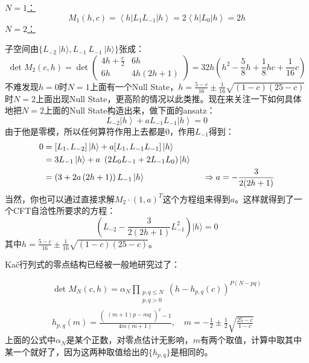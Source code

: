 \begin{example}
	\underline{$N=1$：}
	\begin{equation}
		M_1(h,c)=\left\langle h\right|L_1L_{-1}\left|h\right\rangle=2\left\langle h\right|L_0\left|h\right\rangle=2h
	\end{equation}
	\underline{$N=2$：}
	
	子空间由$\{L_{-2}~|h\rangle ,L_{-1}~L_{-1}~|h\rangle \}$张成：
	\begin{equation}
		\det M_2(c,h)=\det\begin{pmatrix}4h+\frac c2&6h\\6h&4h(2h+1)\end{pmatrix}=32h\left(h^2-\frac58h+\frac18hc+\frac1{16}c\right)
	\end{equation}
	不难发现$h=0$时$N=1$上面有一个Null State，$h=\frac{5-c}{16}\pm\frac1{16}\sqrt{(1-c)(25-c)}$时$N=2$上面出现Null State，更高阶的情况以此类推。现在来关注一下如何具体地把$N=2$上面的Null State构造出来，做下面的ansatz：
	\begin{equation}
		L_{-2}\left|h\right\rangle+aL_{-1}L_{-1}\left|h\right\rangle=0
	\end{equation}
	由于他是零模，所以任何算符作用上去都是0，作用$L_{-1}$得到：
	\begin{equation}
		\begin{aligned}
			0& =[L_1,L_{-2}]\ket{h}+a[L_1,L_{-1}L_{-1}]\ket{h}  \\
			&=3L_{-1}\left|h\right\rangle+a~\left(2L_0L_{-1}+2L_{-1}L_0\right)|h\rangle  \\
			&=\left(3+2a\left(2h+1\right)\right)L_{-1}\left|h\right\rangle \quad\quad\quad\qquad\qquad\Rightarrow a=-\frac{3}{2(2h+1)}
		\end{aligned}
	\end{equation}
	当然，你也可以通过直接求解$M_2 \cdot (1,a)^T$这个方程组来得到$a$。这样就得到了一个CFT自洽性所要求的方程：
	\begin{equation}
		\left(L_{-2}-\frac3{2(2h+1)}L_{-1}^2\right)|h\rangle=0
	\end{equation}
	其中$h=\frac{5-c}{16}\pm\frac1{16}\sqrt{(1-c)(25-c)}$。
\end{example}
Ka\v{c}行列式的零点结构已经被一般地研究过了：
\begin{theorem}
	\begin{equation}
		\boxed{
			\begin{gathered}%
				\det M_N(c,h)=\alpha_N\prod_{\substack{p,q\leq N\\p,q>0}}\left(h-h_{p,q}(c)\right)^{P(N-pq)}\\%
			h_{p,q}(m)=\frac{\left(\begin{array}{c}(m+1)p-mq\\\end{array}\right)^2-1}{4m(m+1)},\quad m=-\frac12\pm\frac12\sqrt{\frac{25-c}{1-c}}
			\end{gathered}
		}
	\end{equation}
	上面的公式中$\alpha_N$是某个正数，对零点估计无影响，$m$有两个取值，计算中取其中某一个就好了，因为这两种取值给出的$\{h_{p,q}\}$是相同的。
\end{theorem}
